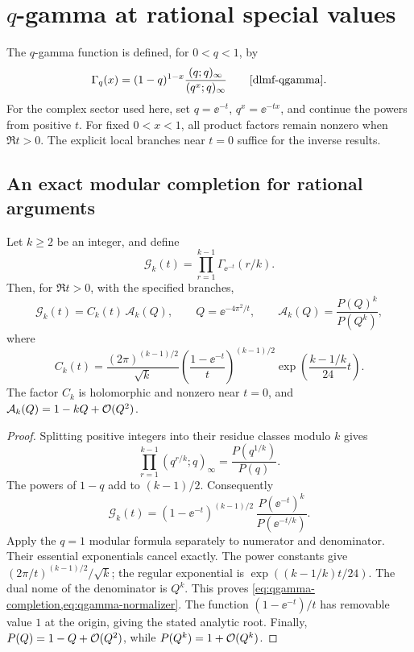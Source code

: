 \section{\texorpdfstring{\(q\)}{q}-gamma at rational special values}
\label{sec:qgamma}

The \(q\)-gamma function is defined, for \(0<q<1\), by
\[
 \Gamma_q(x)=
 (1-q)^{1-x}\frac{(q;q)_\infty}{(q^x;q)_\infty}
 \qquad\text{\cite[Equation 5.18.4]{dlmf-qgamma}}.
\]
For the complex sector used here, set \(q=\ee^{-t}\),
\(q^x=\ee^{-tx}\), and continue the powers from positive \(t\).
For fixed \(0<x<1\), all product factors remain nonzero when
\(\Re t>0\).  The explicit local branches near \(t=0\) suffice
for the inverse results.

\subsection{An exact modular completion for rational arguments}

\begin{theorem}
\label{thm:qgamma-completion}
Let \(k\ge2\) be an integer, and define
\[
 \mathcal G_k(t)=\prod_{r=1}^{k-1}\Gamma_{\ee^{-t}}(r/k).
\]
Then, for \(\Re t>0\), with the specified branches,
\begin{equation}\label{eq:qgamma-completion}
 \mathcal G_k(t)=C_k(t)\,\mathcal A_k(Q),
 \qquad Q=\ee^{-4\pi^2/t},
 \qquad \mathcal A_k(Q)=\frac{P(Q)^k}{P(Q^k)},
\end{equation}
where
\begin{equation}\label{eq:qgamma-normalizer}
 C_k(t)=
 \frac{(2\pi)^{(k-1)/2}}{\sqrt{k}}
 \left(\frac{1-\ee^{-t}}{t}\right)^{(k-1)/2}
 \exp\left(\frac{k-1/k}{24}t\right).
\end{equation}
The factor \(C_k\) is holomorphic and nonzero near \(t=0\),
and
\(\mathcal A_k(Q)=1-kQ+\mathcal O(Q^2)\).
\end{theorem}
\begin{proof}
Splitting positive integers into their residue classes modulo \(k\)
gives
\[
 \prod_{r=1}^{k-1}(q^{r/k};q)_\infty
       =\frac{P(q^{1/k})}{P(q)}.
\]
The powers of \(1-q\) add to \((k-1)/2\).  Consequently
\[
 \mathcal G_k(t)=
 (1-\ee^{-t})^{(k-1)/2}\,
 \frac{P(\ee^{-t})^k}{P(\ee^{-t/k})}.
\]
Apply the \(q=1\) modular formula separately to numerator and
denominator.  Their essential exponentials cancel exactly.
The power constants give
\((2\pi/t)^{(k-1)/2}/\sqrt{k}\);
the regular exponential is
\(\exp((k-1/k)t/24)\).
The dual nome of the denominator is \(Q^k\).
This proves \cref{eq:qgamma-completion,eq:qgamma-normalizer}.
The function \((1-\ee^{-t})/t\) has removable value \(1\)
at the origin, giving the stated analytic root.
Finally, \(P(Q)=1-Q+\mathcal O(Q^2)\), while \(P(Q^k)=1+\mathcal O(Q^k)\).
\end{proof}

